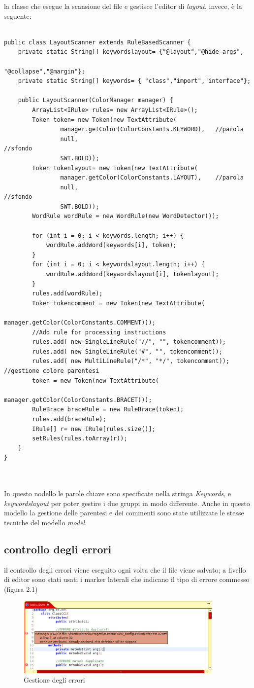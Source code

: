 la classe che esegue la scansione del file e gestisce l'editor di \emph{layout},
invece, è la seguente:

\begin{lstlisting}[caption={LayoutScanner}, style={java}]

public class LayoutScanner extends RuleBasedScanner {
	private static String[] keywordslayout= {"@layout","@hide-args",
												"@collapse","@margin"};
	private static String[] keywords= { "class","import","interface"};
	
	public LayoutScanner(ColorManager manager) {
		ArrayList<IRule> rules= new ArrayList<IRule>();
		Token token= new Token(new TextAttribute(
				manager.getColor(ColorConstants.KEYWORD), 	//parola
				null, 																			//sfondo
				SWT.BOLD));
		Token tokenlayout= new Token(new TextAttribute(
				manager.getColor(ColorConstants.LAYOUT), 	//parola
				null, 																		//sfondo
				SWT.BOLD));
		WordRule wordRule = new WordRule(new WordDetector());

		for (int i = 0; i < keywords.length; i++) {
			wordRule.addWord(keywords[i], token);
		}
		for (int i = 0; i < keywordslayout.length; i++) {
			wordRule.addWord(keywordslayout[i], tokenlayout);
		}
		rules.add(wordRule);
		Token tokencomment = new Token(new TextAttribute(
								manager.getColor(ColorConstants.COMMENT)));
		//Add rule for processing instructions		
		rules.add( new SingleLineRule("//", "", tokencomment));
		rules.add( new SingleLineRule("#", "", tokencomment));
		rules.add( new MultiLineRule("/*", "*/", tokencomment));
//gestione colore parentesi
		token = new Token(new TextAttribute(
										manager.getColor(ColorConstants.BRACET)));
		RuleBrace braceRule = new RuleBrace(token);
		rules.add(braceRule);
		IRule[] r= new IRule[rules.size()];
		setRules(rules.toArray(r));
	}
}



\end{lstlisting}

In questo nodello le parole chiave sono specificate nella stringa
\emph{Keywords}, e \emph{keywordslayout} per poter gestire i due gruppi in modo
differente. Anche in questo modello la gestione delle parentesi e dei commenti
sono state utilizzate le stesse tecniche del modello \emph{model}.

\subsection{controllo degli errori}
il controllo degli errori viene eseguito ogni volta che il file viene salvato; a
livello di editor sono stati usati i marker laterali che indicano il tipo di
errore commesso (figura 2.1)

\begin{figure}[htp]
\begin{center}
  \includegraphics[width=0.9\textwidth]{img/errori_editor.png}
  \caption[labelInTOC]{Gestione degli errori}
\end{center}
\end{figure}